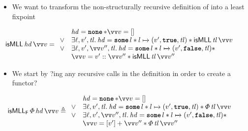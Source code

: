 \documentclass[thesis.tex]{subfiles}
\begin{document}
\begin{example}
    \label{ex:irisisMLL}
    \begin{itemize}
        \item We want to transform the non-structurally recursive definition of \isMLL into a least fixpoint
    \end{itemize}
    \begin{align*}
        \isMLL\, \langv{hd}\, \vect{\val} & =
        \begin{array}{cl}
                 & \langv{hd} = \None * \vect{\val} = []                                                                                             \\
            \lor & \Exists \loc, \val', \langv{tl}. \langv{hd} = \Some l * l \fmapsto (\val', \True, \langv{tl}) * \isMLL\, \langv{tl}\, \vect{\val} \\
            \lor & \Exists \loc, \val', \vect{\val}'', \langv{tl}. \langv{hd} = \Some l * l \fmapsto (\val', \False, \langv{tl}) *                   \\
                 & \vect{\val} = \val' :: \vect{\val}'' * \isMLL\, \langv{tl}\, \vect{\val}''
        \end{array}
    \end{align*}
    \begin{itemize}
        \item We start by ?ing any recursive calls in the definition in order to create a functor?
    \end{itemize}
    \begin{align*}
        \isMLL_\hopred\, \pred\, \langv{hd}\, \vect{v} & \eqdef
        \begin{array}{rl}
                 & \langv{hd} = \None * \vect{v} = []                                                                                            \\
            \lor & \Exists \loc, \val', \langv{tl}. \langv{hd} = \Some l * l \fmapsto (\val', \True, \langv{tl}) * \pred\, \langv{tl}\, \vect{v} \\
            \lor & \Exists \loc, \val', \vect{\val}'', \langv{tl}. \langv{hd} = \Some l * l \fmapsto (\val', \False, \langv{tl})*                \\
                 & \vect{\val} = [\val'] + \vect{\val}'' * \pred\, \langv{tl}\, \vect{\val}''
        \end{array}
    \end{align*}
    \begin{itemize}

\end{itemize}
\end{example}
\end{document}
